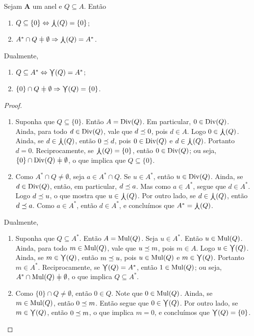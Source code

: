 \begin{proposition}
Sejam $\bm A$ um anel e $Q \subseteq A$. Então
	\begin{enumerate}
	\item $Q \subseteq \{0\} \Leftrightarrow \mathop{\bigcurlywedge}(Q) = \{0\}$;
	\item $A^* \cap Q \neq \emptyset \Rightarrow \mdc(Q) = A^*$.
	\end{enumerate}

	Dualmente,
	\begin{enumerate}
	\item $Q \subseteq A^* \Leftrightarrow \mathop{\bigcurlyvee}(Q) = A^*$;
	\item $\{0\} \cap Q \neq \emptyset \Rightarrow \mmc(Q) = \{0\}$.
	\end{enumerate}
\end{proposition}
\begin{proof}
	\begin{enumerate}
	\item Suponha que $Q \subseteq \{0\}$. Então $A = \operatorname{Div}(Q)$. Em particular, $0 \in \operatorname{Div}(Q)$. Ainda, para todo $d \in \operatorname{Div}(Q)$, vale que $d \preceq 0$, pois $d \in A$. Logo $0 \in \mathop{\bigcurlywedge}(Q)$. Ainda, se $d \in \mathop{\bigcurlywedge}(Q)$, então $0 \preceq d$, pois $0 \in \operatorname{Div}(Q)$ e $d \in \mathop{\bigcurlywedge}(Q)$. Portanto $d=0$. Reciprocamente, se $\mathop{\bigcurlywedge}(Q)=\{0\}$, então $0 \in \operatorname{Div}(Q)$; ou seja, $\{0\} \cap \divv(Q) \neq \emptyset$, o que implica que $Q \subseteq \{0\}$.

	\item Como $A^* \cap Q \neq \emptyset$, seja $a \in A^* \cap Q$. Se $u \in A^*$, então $u \in \operatorname{Div}(Q)$. Ainda, se $d \in \operatorname{Div}(Q)$, então, em particular, $d \preceq a$. Mas como $a \in A^*$, segue que $d \in A^*$. Logo $d \preceq u$, o que mostra que $u \in \mathop{\bigcurlywedge}(Q)$. Por outro lado, se $d \in \mathop{\bigcurlywedge}(Q)$, então $d \preceq a$. Como $a \in A^*$, então $d \in A^*$, e concluímos que $A^*=\mathop{\bigcurlywedge}(Q)$.
	\end{enumerate}

Dualmente,
	\begin{enumerate}
	\item Suponha que $Q \subseteq A^*$. Então $A = \operatorname{Mul}(Q)$. Seja $u \in A^*$. Então $u \in \operatorname{Mul}(Q)$. Ainda, para todo $m \in \operatorname{Mul}(Q)$, vale que $u \preceq m$, pois $m \in A$. Logo $u \in \mathop{\bigcurlyvee}(Q)$. Ainda, se $m \in \mathop{\bigcurlyvee}(Q)$, então $m \preceq u$, pois $u \in \operatorname{Mul}(Q)$ e $m \in \mathop{\bigcurlyvee}(Q)$. Portanto $m \in A^*$. Reciprocamente, se $\mathop{\bigcurlyvee}(Q)=A^*$, então $1 \in \operatorname{Mul}(Q)$; ou seja, $A^* \cap \mul(Q) \neq \emptyset$, o que implica $Q \subseteq A^*$.

	\item Como $\{0\} \cap Q \neq \emptyset$, então $0 \in Q$. Note que $0 \in \operatorname{Mul}(Q)$. Ainda, se $m \in \operatorname{Mul}(Q)$, então $0 \preceq m$. Então segue que $0 \in \mathop{\bigcurlyvee}(Q)$. Por outro lado, se $m \in \mathop{\bigcurlyvee}(Q)$, então $0 \preceq m$, o que implica $m=0$, e concluímos que $\mathop{\bigcurlyvee}(Q) = \{0\}$.
	\qedhere
	\end{enumerate}
\end{proof}

